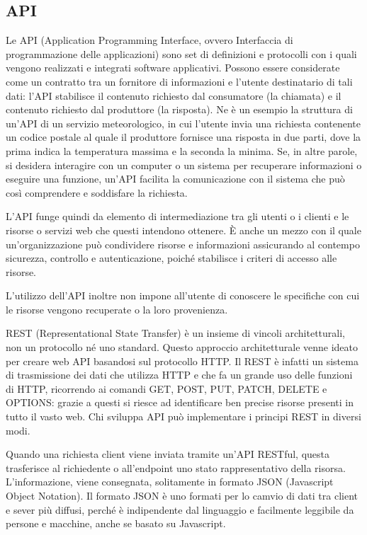 \documentclass[12pt,a4paper]{article}
\begin{document}
\subsection{API}

Le API (Application Programming Interface, ovvero Interfaccia di programmazione delle applicazioni) sono set di definizioni e protocolli con i quali vengono realizzati e integrati software applicativi. Possono essere considerate come un contratto tra un fornitore di informazioni e l'utente destinatario di tali dati: l'API stabilisce il contenuto richiesto dal consumatore (la chiamata) e il contenuto richiesto dal produttore (la risposta). Ne è un esempio la struttura di un'API di un servizio meteorologico, in cui l'utente invia una richiesta contenente un codice postale al quale il produttore fornisce una risposta in due parti, dove la prima indica la temperatura massima e la seconda la minima.
\hfill \break \break
Se, in altre parole, si desidera interagire con un computer o un sistema per recuperare informazioni o eseguire una funzione, un'API facilita la comunicazione con il sistema che può così comprendere e soddisfare la richiesta.

L'API funge quindi da elemento di intermediazione tra gli utenti o i clienti e le risorse o servizi web che questi intendono ottenere. È anche un mezzo con il quale un'organizzazione può condividere risorse e informazioni assicurando al contempo sicurezza, controllo e autenticazione, poiché stabilisce i criteri di accesso alle risorse.

L'utilizzo dell'API inoltre non impone all'utente di conoscere le specifiche con cui le risorse vengono recuperate o la loro provenienza.

REST (Representational State Transfer) è un insieme di vincoli architetturali, non un protocollo né uno standard. Questo approccio architetturale venne ideato per creare web API basandosi sul protocollo HTTP. Il REST è infatti un sistema di trasmissione dei dati che utilizza HTTP e che fa un grande uso delle funzioni di HTTP, ricorrendo ai comandi GET, POST, PUT, PATCH, DELETE e OPTIONS: grazie a questi si riesce ad identificare ben precise risorse presenti in tutto il vasto web. Chi sviluppa API può implementare i principi REST in diversi modi.

Quando una richiesta client viene inviata tramite un'API RESTful, questa trasferisce al richiedente o all'endpoint uno stato rappresentativo della risorsa. L'informazione, viene consegnata, solitamente in formato JSON (Javascript Object Notation). Il formato JSON è uno formati per lo camvio di dati tra client e sever più diffusi, perché è indipendente dal linguaggio e facilmente leggibile da persone e macchine, anche se basato su Javascript.
\end{document}
